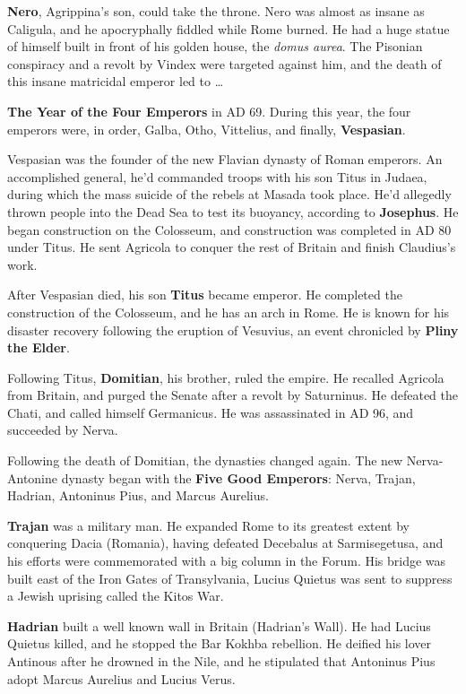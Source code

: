 \textbf{Nero}, Agrippina's son, could take the throne.
Nero was almost as insane as Caligula, and he apocryphally fiddled while Rome burned.
He had a huge statue of himself built in front of his golden house, the \textit{domus aurea}.
The Pisonian conspiracy and a revolt by Vindex were targeted against him,
and the death of this insane matricidal emperor led to \ldots

\textbf{The Year of the Four Emperors} in AD 69. During this year, the four emperors were, in order,
Galba, Otho, Vittelius, and finally, \textbf{Vespasian}.

Vespasian was the founder of the new Flavian dynasty of Roman emperors.
An accomplished general, he'd commanded troops with his son Titus in Judaea,
during which the mass suicide of the rebels at Masada took place.
He'd allegedly thrown people into the Dead Sea to test its buoyancy, according to \textbf{Josephus}.
He began construction on the Colosseum, and construction was completed in AD 80 under Titus.
He sent Agricola to conquer the rest of Britain and finish Claudius's work.

After Vespasian died, his son \textbf{Titus} became emperor.
He completed the construction of the Colosseum, and he has an arch in Rome.
He is known for his disaster recovery following the eruption of Vesuvius,
an event chronicled by \textbf{Pliny the Elder}.

Following Titus, \textbf{Domitian}, his brother, ruled the empire.
He recalled Agricola from Britain, and purged the Senate after a revolt by Saturninus.
He defeated the Chati, and called himself Germanicus.
He was assassinated in AD 96, and succeeded by Nerva.

Following the death of Domitian, the dynasties changed again.
The new Nerva-Antonine dynasty began with the \textbf{Five Good Emperors}:
Nerva, Trajan, Hadrian, Antoninus Pius, and Marcus Aurelius.

\textbf{Trajan} was a military man.
He expanded Rome to its greatest extent by conquering Dacia (Romania),
having defeated Decebalus at Sarmisegetusa,
and his efforts were commemorated with a big column in the Forum.
His bridge was built east of the Iron Gates of Transylvania,
Lucius Quietus was sent to suppress a Jewish uprising called the Kitos War.

\textbf{Hadrian} built a well known wall in Britain (Hadrian's Wall).
He had Lucius Quietus killed, and he stopped the Bar Kokhba rebellion.
He deified his lover Antinous after he drowned in the Nile, and he stipulated that
Antoninus Pius adopt Marcus Aurelius and Lucius Verus.

